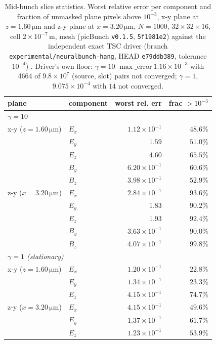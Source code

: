 \begin{table}[t]
\centering
\small
\caption{Mid-bunch slice statistics. Worst relative error per component and
fraction of unmasked plane pixels above $10^{-3}$, x-y plane at
$z=1.60\,\si{\micro\metre}$ and z-y plane at $x=3.20\,\si{\micro\metre}$, $N=1000$,
$32\times32\times16$, cell $2\times10^{-7}$\,m, mesh (picBunch
\texttt{v0.1.5}, \texttt{5f1981e2}) against the independent exact TSC driver
(branch \texttt{experimental/neuralbunch-hang}, HEAD \texttt{e79ddb389},
tolerance $10^{-4}$) \citep{SL1,SL2}. Driver's own floor: $\gamma=10$
$\max\_\mathrm{error}~1.16\times10^{-3}$ with 4664 of $9.8\times10^{7}$
(source, slot) pairs not converged; $\gamma=1$, $9.075\times10^{-4}$ with $14$
not converged.}
\label{tab:slices}
\begin{tabular}{llrr}
\toprule
plane & component & worst rel. err & frac $>10^{-3}$ \\
\midrule
\multicolumn{4}{l}{\emph{$\gamma=10$}} \\
x-y ($z\!=\!1.60\,\si{\micro\metre}$) & $E_x$ & $1.12\times10^{-1}$ & $48.6\%$ \\
 & $E_y$ & $1.59$ & $51.0\%$ \\
 & $E_z$ & $4.60$ & $65.5\%$ \\
 & $B_y$ & $6.20\times10^{-1}$ & $60.6\%$ \\
 & $B_z$ & $3.98\times10^{-1}$ & $52.9\%$ \\
z-y ($x\!=\!3.20\,\si{\micro\metre}$) & $E_x$ & $2.84\times10^{-1}$ & $93.6\%$ \\
 & $E_y$ & $1.83$ & $90.2\%$ \\
 & $E_z$ & $1.93$ & $92.4\%$ \\
 & $B_y$ & $3.63\times10^{-1}$ & $90.0\%$ \\
 & $B_z$ & $4.07\times10^{-1}$ & $99.8\%$ \\
\midrule
\multicolumn{4}{l}{\emph{$\gamma=1$ (stationary)}} \\
x-y ($z\!=\!1.60\,\si{\micro\metre}$) & $E_x$ & $1.20\times10^{-1}$ & $22.8\%$ \\
 & $E_y$ & $1.34\times10^{-1}$ & $23.3\%$ \\
 & $E_z$ & $4.15\times10^{-1}$ & $74.7\%$ \\
z-y ($x\!=\!3.20\,\si{\micro\metre}$) & $E_x$ & $4.15\times10^{-1}$ & $49.6\%$ \\
 & $E_y$ & $1.37\times10^{-1}$ & $61.7\%$ \\
 & $E_z$ & $1.23\times10^{-1}$ & $53.9\%$ \\
\bottomrule
\end{tabular}
\end{table}

